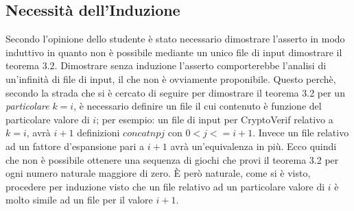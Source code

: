 \documentclass[a4paper,openright,twoside,12pt]{report}
\begin{document}
\subsection{Necessit\`a dell'Induzione}
Secondo l'opinione dello studente \`e stato necessario dimostrare l'asserto in modo induttivo in quanto non \`e possibile mediante un unico file di input
dimostrare il teorema 3.2. Dimostrare senza induzione l'asserto comporterebbe l'analisi di un'infinit\`a di file di input, il che non \`e
ovviamente proponibile. Questo perch\`e, secondo la strada che si \`e cercato di seguire per dimostrare il teorema 3.2 per
un \emph{particolare} $k=i$, \`e necessario definire un file il cui contenuto
 \`e funzione del particolare valore di $i$; per esempio: un file di input per CryptoVerif
relativo a $k=i$, avr\`a $i+1$ definizioni $concatnpj$ con $0<j<=i+1$. Invece un file relativo ad un fattore d'espansione
pari a $i+1$ avr\`a un'equivalenza in pi\`u. Ecco quindi che non \`e possibile ottenere una sequenza di giochi che provi il teorema
3.2 per ogni numero naturale maggiore di zero. \`E per\`o naturale, come si \`e visto, procedere per induzione visto che
un file relativo ad un particolare valore di $i$ \`e molto simile ad un file per il valore $i+1$. 
\end{document}
